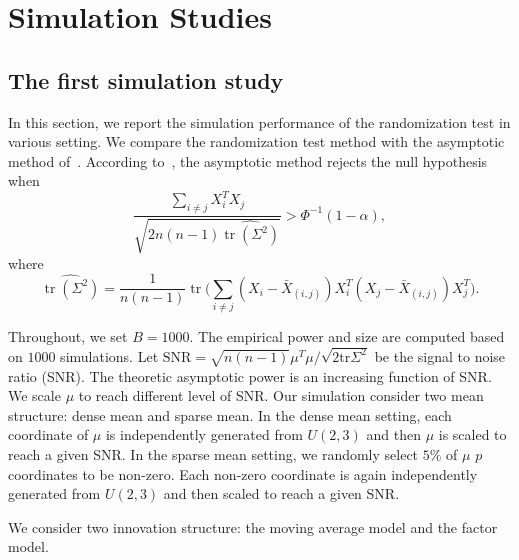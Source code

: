 \documentclass[review]{elsarticle}
\DeclareMathOperator{\mytr}{tr}
\theoremstyle{plain}
\theoremstyle{definition}
\theoremstyle{remark}
\begin{document}
\section{Simulation Studies}
\subsection{The first simulation study}
In this section, we report the simulation performance of the randomization test in various setting.
We compare the randomization test method with the asymptotic method of~\cite{Chen2010A}.
According to~\cite{Chen2010A}, the asymptotic method rejects the null hypothesis when
$$
\frac{\sum_{i\neq j}X_i^T X_j}{\sqrt{2n(n-1)\widehat{\mytr(\Sigma^2)}}}>\Phi^{-1}(1-\alpha),
$$
where
$$
 \widehat{\mytr(\Sigma^2)}=\frac{1}{n(n-1)}\mytr\Big(\sum_{i\neq j}(X_i-\bar{X}_{(i,j)})X_i^T (X_j-\bar{X}_{(i,j)})X_j^T\Big).
$$

Throughout, we set $B=1000$.
The empirical power and size are computed based on $1000$ simulations.
Let $\mathrm{SNR}=\sqrt{n(n-1)}\mu^T \mu /\sqrt{2\mathrm{tr}\Sigma^2}$ be the signal to noise ratio (SNR).
The theoretic asymptotic power is an increasing function of SNR\@.
We scale $\mu$ to reach different level of SNR\@.
Our simulation consider two mean structure: dense mean and sparse mean.
In the dense mean setting, each coordinate of $\mu$ is independently generated from $U(2,3)$ and then $\mu$ is scaled to reach a given SNR\@.
In the sparse mean setting, we randomly select $5\%$ of $\mu$ $p$ coordinates to be non-zero.
Each non-zero coordinate is again independently generated from $U(2,3)$ and then scaled to reach a given SNR\@.

We consider two innovation structure: the moving average model and the factor model.
\end{document}
